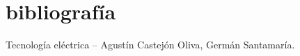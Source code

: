 \section{bibliografía}

\begin{thebibliography}{}
\pagestyle{empty}
 Tecnología eléctrica – Agustín Castejón Oliva, Germán Santamaría.
\end{thebibliography}